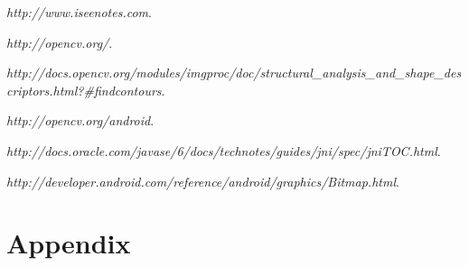 \documentclass[pdftex,11pt,a4paper]{article}
\begin{document}


\renewcommand{\abstractname}{Executive Summary}

\tableofcontents
\listoffigures
\listoftables







\begin{thebibliography}{9}

  \emph{http://www.iseenotes.com}.

  \emph{http://opencv.org/}.

  \emph{http://docs.opencv.org/modules/imgproc/doc/structural\_analysis\_and\_shape\_descriptors.html?\#findcontours}.

  \emph{http://opencv.org/android}.

  \emph{http://docs.oracle.com/javase/6/docs/technotes/guides/jni/spec/jniTOC.html}.

  \emph{http://developer.android.com/reference/android/graphics/Bitmap.html}.

\end{thebibliography}

\section{Appendix}
\end{document}
